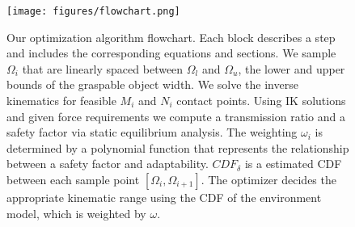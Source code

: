 \documentclass[letterpaper, 10 pt, conference]{ieeeconf}  %
\begin{document}
\begin{figure}
    \centering
    \texttt{[image: figures/flowchart.png]}
    \caption{Our optimization algorithm flowchart. Each block describes a step and includes the corresponding equations and sections. We sample $\Omega_i$ that are linearly spaced between $\Omega_l$ and $\Omega_u$, the lower and upper bounds of the graspable object width. 
    We solve the inverse kinematics for feasible $M_i$ and $N_i$ contact points. Using IK solutions and given force requirements we compute a transmission ratio and a safety factor via static equilibrium analysis. The weighting $\omega_i$ is determined by a polynomial function that represents the relationship between a safety factor and adaptability. $CDF_\delta$ is a estimated CDF between each sample point $[\Omega_i,\Omega_{i+1}]$.
    The optimizer decides the appropriate kinematic range using the CDF of the environment model, which is weighted by $\omega$.} 
    \label{fig:flowchart}
\end{figure}


\end{document}
